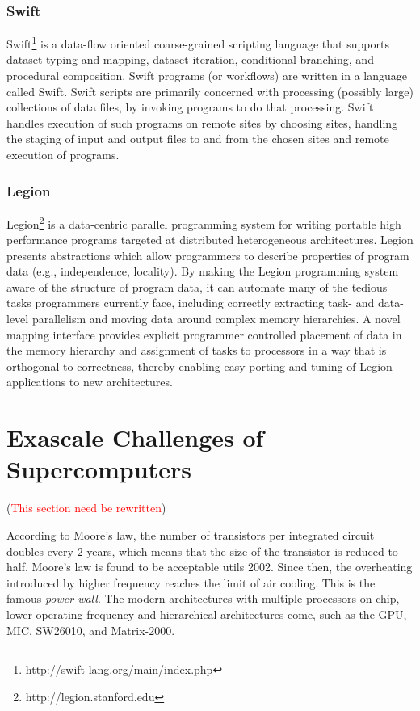 \subsubsection{Swift}

Swift\footnote{http://swift-lang.org/main/index.php} \cite{wilde2011swift} is a data-flow oriented coarse-grained scripting language that supports dataset typing and mapping, dataset iteration, conditional branching, and procedural composition. Swift programs (or workflows) are written in a language called Swift. Swift scripts are primarily concerned with processing (possibly large) collections of data files, by invoking programs to do that processing. Swift handles execution of such programs on remote sites by choosing sites, handling the staging of input and output files to and from the chosen sites and remote execution of programs.

\subsubsection{Legion}

Legion\footnote{http://legion.stanford.edu} \cite{grimshaw1994synopsis} is a data-centric parallel programming system for writing portable high performance programs targeted at distributed heterogeneous architectures. Legion presents abstractions which allow programmers to describe properties of program data (e.g., independence, locality). By making the Legion programming system aware of the structure of program data, it can automate many of the tedious tasks programmers currently face, including correctly extracting task- and data-level parallelism and moving data around complex memory hierarchies. A novel mapping interface provides explicit programmer controlled placement of data in the memory hierarchy and assignment of tasks to processors in a way that is orthogonal to correctness, thereby enabling easy porting and tuning of Legion applications to new architectures.


\section{Exascale Challenges of Supercomputers}

 (\textcolor{red}{This section need be rewritten})
 
According to Moore's law, the number of transistors per integrated circuit doubles every $2$ years, which means that the size of the transistor is reduced to half. Moore's law is found to be acceptable utils 2002. Since then, the overheating introduced by higher frequency reaches the limit of air cooling. This is the famous \textit{power wall}. The modern architectures with multiple processors on-chip, lower operating frequency and hierarchical architectures come, such as the GPU, MIC, SW26010, and Matrix-2000.

